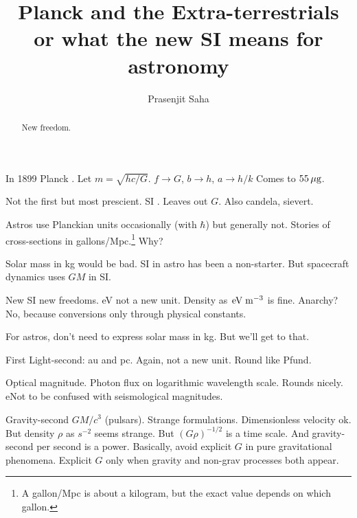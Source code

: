 \documentclass[aps,prb,12pt]{revtex4-1}
\def\unit#1{\;{\rm#1}}
\begin{document}
\title{Planck and the Extra-terrestrials\\
       or what the new SI means for astronomy}

\author{Prasenjit Saha} 

\begin{abstract}
New freedom.
\end{abstract}

\maketitle

In 1899 Planck \cite{Planck1899}.
Let $m=\sqrt{hc/G}$.
$f \rightarrow G$, $b\rightarrow h$, $a\rightarrow h/k$
Comes to $55\rm\,\mu g$.

Not the first \cite{Tomilin1999} but most prescient.  SI
\cite{Jeckelmann_2018}.  Leaves out $G$.  Also candela, sievert.

Astros use Planckian units occasionally (with $\hbar$) but generally
not.  Stories of cross-sections in gallons/Mpc.\footnote{A gallon/Mpc
  is about a kilogram, but the exact value depends on which gallon.}
Why?

Solar mass in kg would be bad.  SI in astro has been a non-starter.
But spacecraft dynamics uses $GM$ in SI.

New SI new freedoms.  eV not a new unit.  Density as
$\!\unit{eV}\unit{m}^{-3}$ is fine.  Anarchy?  No, because conversions
only through physical constants.

For astros, don't need to express solar mass in kg.  But we'll get to
that.

First Light-second: au and pc.  Again, not a new unit.  Round like Pfund.

Optical magnitude.  Photon flux on logarithmic wavelength scale.
Rounds nicely.  eNot to be confused with seismological magnitudes.

Gravity-second $GM/c^3$
(pulsars).
Strange formulations.
Dimensionless velocity ok.  But density $\rho$ as $s^{-2}$ seems
strange.  But $(G\rho)^{-1/2}$ is a time scale.  And gravity-second
per second is a power.  Basically, avoid explicit $G$ in pure
gravitational phenomena.  Explicit $G$ only when gravity and non-grav
processes both appear.
\end{document}
